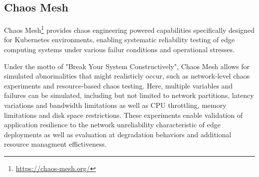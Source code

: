 \subsection{Chaos Mesh}
Chaos Mesh\footnote{\url{https://chaos-mesh.org/}} provides chaos engineering powered capabilities specifically designed for Kubernetes environments, enabling systematic reliability testing of edge computing systems under various failur conditions and operational stresses.

Under the motto of "Break Your System Constructively", Chaos Mesh allows for simulated abnormalities that might realisticly occur, such as network-level chaos experiments and resource-based chaos testing.
Here, multiple variables and failures can be simulated, including but not limited to network partitions, latency variations and bandwidth limitations as well as CPU throttling, memory limitations and disk space restrictions.
These experiments enable validation of application resilience to the network unreliability characteristic of edge deployments as well as evaluation at degradation behaviors and additional resource managment effictiveness.
